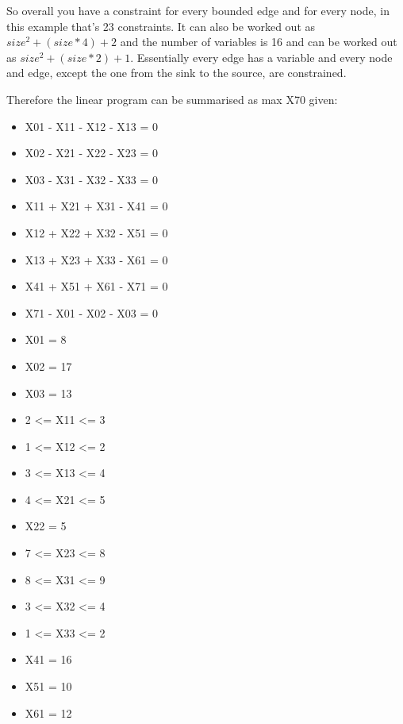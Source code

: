 \documentclass[10pt]{article}
\begin{document}
So overall you have a constraint for every bounded edge and for every node, in this example that's 23 constraints. It can also be worked out as $size^2 + (size * 4) + 2$ and the number of variables is 16 and can be worked out as $size^2 + (size * 2) + 1$. Essentially every edge has a variable and every node and edge, except the one from the sink to the source, are constrained.

Therefore the linear program can be summarised as max X70 given:
\begin{itemize}
    \item X01 - X11 - X12 - X13 = 0
    \item X02 - X21 - X22 - X23 = 0
    \item X03 - X31 - X32 - X33 = 0
    \item X11 + X21 + X31 - X41 = 0
    \item X12 + X22 + X32 - X51 = 0
    \item X13 + X23 + X33 - X61 = 0
    \item X41 + X51 + X61 - X71 = 0
    \item X71 - X01 - X02 - X03 = 0
    
    \item X01 = 8
    \item X02 = 17
    \item X03  = 13
    
    \item 2 <= X11 <= 3
    \item 1 <= X12 <= 2
    \item 3 <= X13 <= 4
    
    \item 4 <= X21 <= 5
    \item  X22 = 5
    \item 7 <= X23 <= 8
    
    \item 8 <= X31 <= 9
    \item 3 <= X32 <= 4
    \item 1 <= X33 <= 2
    
    \item X41 = 16
    \item X51 = 10
    \item X61 = 12
\end{itemize}
\end{document}
